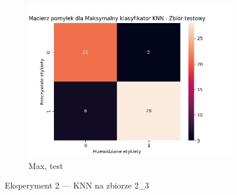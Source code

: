 \documentclass[12pt]{article}
\newcommand*{\subfigwidth}{0.24\textwidth}
\begin{document}
\begin{figure}[H]
\begin{subfigure}[t]{\subfigwidth}
        \includegraphics[width=\linewidth]{img/exp_2/knn/2_3/max/test_matrix.png}
        \caption{Max, test}
    \end{subfigure} 
    
    \caption{Eksperyment 2 --- KNN na zbiorze 2\_3}\label{fig:figure15}
\end{figure}

\clearpage
\end{document}
